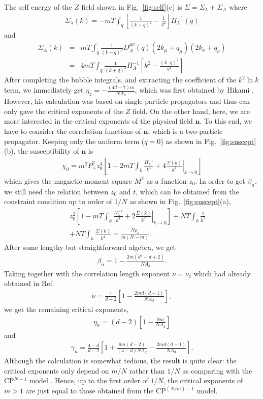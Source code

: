 \documentclass[aps,twocolumn,superscriptaddress]{revtex4-1}
\newcommand{\bea}{\begin{eqnarray}}
\newcommand{\eea}{\end{eqnarray}}
\newcommand{\bn}{\mathbf{n}}
\begin{document}
The self energy of the $Z$ field shown in Fig.~\ref{fig:self}(c) is $\Sigma=\Sigma_\lambda+\Sigma_A$ where \bea
\Sigma_\lambda(k)=-mT\int_q \left[\frac{1}{(k+q)^2}-\frac{1}{q^2}\right]\Pi_\lambda^{-1}(q) \eea and \bea \Sigma_A(k)
&=& mT\int_q \frac{1}{(k+q)^2} D_A^{\mu\nu}(q) (2k_\mu+q_\mu) (2k_\nu+q_\nu) \nonumber \\&=& 4mT\int_q
\frac{1}{(k+q)^2}\Pi_A^{-1}\left[ k^2-\frac{(k\cdot q)^2}{q^2} \right] \eea After completing the bubble integrals, and
extracting the coefficient of the $k^2\ln k$ term, we immediately get $\eta_z=-\frac{(4d-7)m}{NA_d}$, which was first obtained by
Hikami \cite{hikami1980}. However, his calculation was based on single particle propagators and thus can only gave the
critical exponents of the $Z$ field. On the other hand, here, we are more interested in the critical exponents of the
physical field $\bn$. To this end, we have to consider the correlation functions of $\bn$, which is a two-particle
propagator. Keeping only the uniform term ($q=0$) as shown in Fig.~\ref{fig:suscept}(b), the susceptibility of $\bn$ is
\bea \chi_0=m^2P_+^2 z_0^4\left[ 1-  2mT\int_k \frac{\Pi_\lambda^{-1}}{k^4} + 4
\left.\frac{\Sigma(k)}{k^2}\right|_{k\rightarrow0} \right] \eea which gives the magnetic moment square $M^2$ as a
function $z_0$. In order to get $\beta_n$, we still need the relation between $z_0$ and $t$, which can be obtained
from the constraint condition up to order of $1/N$ as shown in Fig.~\ref{fig:suscept}(a), \bea &&z_0^2 \left[ 1-
mT\int_k \frac{\Pi_\lambda^{-1}}{k^4} + 2 \left.\frac{\Sigma(k)}{k^2}\right|_{k\rightarrow0}\right] + NT\int_k
\frac{1}{k^2} \nonumber\\&&+ NT\int_k \frac{\Sigma(k)}{k^4} = \frac{N\rho_s}{m(N-m)}. \eea After some lengthy
but straightforward algebra, we get \bea \beta_n=1-\frac{2m(d^2-d+2)}{NA_d}. \eea Taking together with the
correlation length exponent $\nu=\nu_z$ which had already obtained in Ref.~\cite{hikami1980} \bea
\nu=\frac{1}{d-2}\left[ 1-\frac{2md(d-1)}{NA_d} \right], \eea we get the remaining critical exponents, \bea
\eta_n=(d-2)\left[1-\frac{8m}{NA_d}\right] \eea and \bea \gamma_n=\frac{4-d}{d-2}\left[
1+\frac{8m(d-2)}{(4-d)NA_d}-\frac{2md(d-1)}{NA_d} \right]. \eea Although the calculation is somewhat tedious, the
result is quite clear: the critical exponents only depend on $m/N$ rather than $1/N$ as comparing with the
CP$^{N-1}$ model \cite{irkhin1996}. Hence, up to the first order of $1/N$, the critical exponents of $m>1$ are just
equal to those obtained from the CP$^{(N/m)-1}$ model. 
\end{document}
